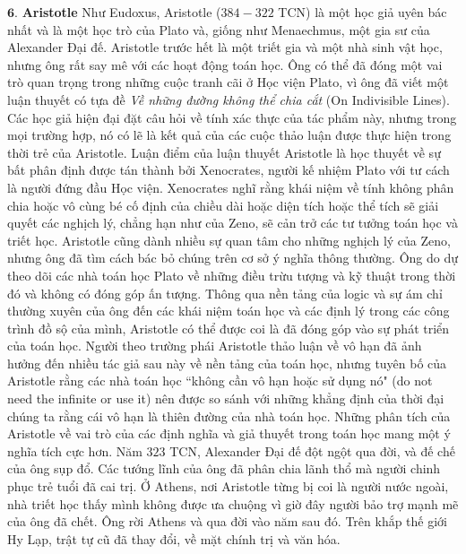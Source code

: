 \begin{multicols}{2}
	\vskip 0.1cm
	$\pmb{6.}$ \textbf{\color{lichsutoanhoc}Aristotle} 
	\vskip 0.1cm
	Như Eudoxus, Aristotle ($384-322$ TCN) là một học giả uyên bác nhất và là một học trò của Plato và, giống như Menaechmus, một gia sư của Alexander Đại đế. 
	\vskip 0.1cm
	Aristotle trước hết là một triết gia và một nhà sinh vật học, nhưng ông rất say mê với các hoạt động toán học. 
	\vskip 0.1cm
	Ông có thể đã đóng một vai trò quan trọng trong những cuộc tranh cãi ở Học viện Plato, vì ông đã viết một luận thuyết có tựa đề \textit{Về những đường không thể chia cắt} (On Indivisible Lines). Các học giả hiện đại đặt câu hỏi về tính xác thực của tác phẩm này, nhưng trong mọi trường hợp, nó có lẽ là kết quả của các cuộc thảo luận được thực hiện trong thời trẻ của Aristotle. 
	\vskip 0.1cm
	Luận điểm của luận thuyết Aristotle là học thuyết về sự bất phân định được tán thành bởi Xenocrates, người kế nhiệm Plato với tư cách là người đứng đầu Học viện.  
	\vskip 0.1cm
	Xenocrates nghĩ rằng khái niệm về tính không phân chia hoặc vô cùng bé cố định của chiều dài hoặc diện tích hoặc thể tích sẽ giải quyết các nghịch lý, chẳng hạn như của Zeno, sẽ cản trở các tư tưởng toán học và triết học. 
	\vskip 0.1cm
	Aristotle cũng dành nhiều sự quan tâm cho những nghịch lý của Zeno, nhưng ông đã tìm cách bác bỏ chúng trên cơ sở ý nghĩa thông thường. Ông do dự theo dõi các nhà toán học Plato về những điều trừu tượng và kỹ thuật trong thời đó và không có đóng góp ấn tượng. 
	\vskip 0.1cm
	Thông qua nền tảng của logic và sự ám chỉ thường xuyên của ông đến các khái niệm toán học và các định lý trong các công trình đồ sộ của mình, Aristotle có thể được coi là đã đóng góp vào sự phát triển của toán học. 
	\vskip 0.1cm
	Người theo trường phái Aristotle thảo luận về vô hạn đã ảnh hưởng đến nhiều tác giả sau này về nền tảng của toán học, nhưng tuyên bố của Aristotle rằng các nhà toán học ``không cần vô hạn hoặc sử dụng nó" (do not need the
	infinite or use it) nên được so sánh với những khẳng định của thời đại chúng ta rằng cái vô hạn là thiên đường của nhà toán học.  
	\vskip 0.1cm
	Những phân tích của Aristotle về vai trò của các định nghĩa và giả thuyết trong toán học mang một ý nghĩa tích cực hơn.
	\vskip 0.1cm
	Năm $323$ TCN, Alexander Đại đế đột ngột qua đời, và đế chế của ông sụp đổ. Các tướng lĩnh của ông đã phân chia lãnh thổ mà người chinh phục trẻ tuổi đã cai trị. Ở Athens, nơi Aristotle từng bị coi là người nước ngoài, nhà triết học thấy mình không được ưa chuộng vì giờ đây người bảo trợ mạnh mẽ của ông đã chết. Ông rời Athens và qua đời vào năm sau đó.
	\vskip 0.1cm
	Trên khắp thế giới Hy Lạp, trật tự cũ đã thay đổi, về mặt chính trị và văn hóa. 

\end{multicols}
